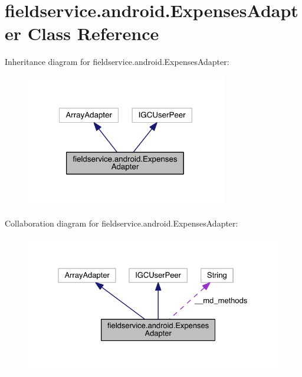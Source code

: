 \hypertarget{classfieldservice_1_1android_1_1_expenses_adapter}{\section{fieldservice.\+android.\+Expenses\+Adapter Class Reference}
\label{classfieldservice_1_1android_1_1_expenses_adapter}
}


Inheritance diagram for fieldservice.\+android.\+Expenses\+Adapter\+:
\nopagebreak
\begin{figure}[H]
\begin{center}
\leavevmode
\includegraphics[width=248pt]{classfieldservice_1_1android_1_1_expenses_adapter__inherit__graph}
\end{center}
\end{figure}


Collaboration diagram for fieldservice.\+android.\+Expenses\+Adapter\+:
\nopagebreak
\begin{figure}[H]
\begin{center}
\leavevmode
\includegraphics[width=327pt]{classfieldservice_1_1android_1_1_expenses_adapter__coll__graph}
\end{center}
\end{figure}
